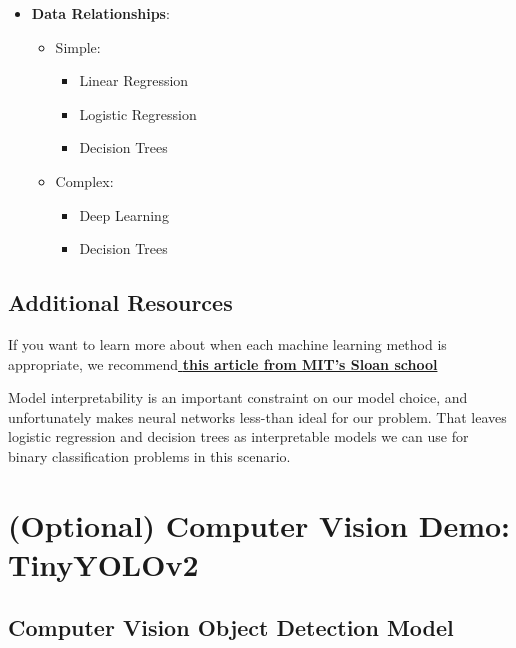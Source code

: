 \begin{itemize}
\begin{itemize}
\end{itemize}

    \item \textbf{Data Relationships}:

\begin{itemize}
        \item Simple:

    \begin{itemize}
            \item Linear Regression
            \item Logistic Regression
            \item Decision Trees
    \end{itemize}

        \item Complex:

    \begin{itemize}
            \item Deep Learning
            \item Decision Trees
    \end{itemize}

\end{itemize}

\end{itemize}

\subsection{Additional Resources}

If you want to learn more about when each machine learning method is appropriate, we recommend\href{https://mitsloan.mit.edu/ideas-made-to-matter/machine-learning-explained}{\textbf{ this article from MIT's Sloan school}}\newline

Model interpretability is an important constraint on our model choice, and unfortunately makes neural networks less-than ideal for our problem. That leaves logistic regression and decision trees as interpretable models we can use for binary classification problems in this scenario.

\section{(Optional) Computer Vision Demo: TinyYOLOv2}

\subsection{Computer Vision Object Detection Model}

